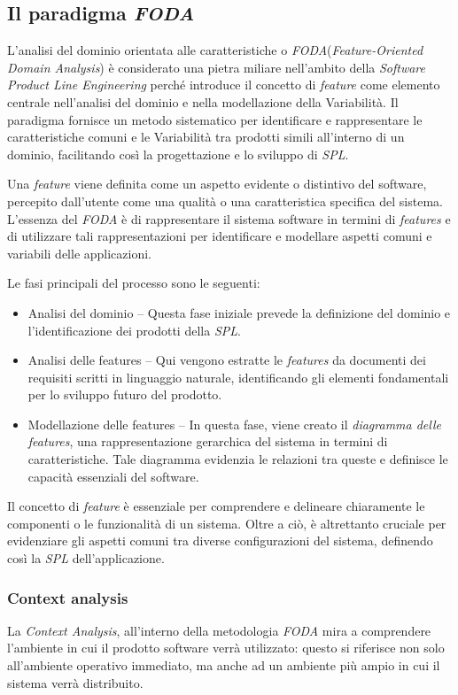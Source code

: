 \documentclass[12pt]{report}
\newcommand{\spl}{\textsl{SPL}\xspace}
\newcommand{\foda}{\textsl{FODA}\xspace}
\begin{document}
\subsection{ Il paradigma \foda}
L'analisi del dominio orientata alle caratteristiche o \foda (\textit{Feature-Oriented Domain Analysis}) \cite{kang:cohen:hess:nowak:peters}
è considerato una pietra miliare nell'ambito della \textit{Software Product Line Engineering} perché introduce il concetto di \textit{feature} come elemento centrale nell'analisi del dominio e nella modellazione della Variabilità. Il paradigma fornisce un metodo sistematico per identificare e rappresentare le caratteristiche comuni e le Variabilità tra prodotti simili all'interno di un dominio, facilitando così la progettazione e lo sviluppo di \spl.

Una \textit{feature} viene definita come un aspetto evidente o distintivo del software, percepito dall'utente come una qualità o una caratteristica specifica del sistema. L'essenza del \foda è di rappresentare il sistema software in termini di \textit{features} e di utilizzare tali rappresentazioni per identificare e modellare aspetti comuni e variabili delle applicazioni.

Le fasi principali del processo sono le seguenti:

\begin{itemize}
\item \textsf{Analisi del dominio} -- Questa fase iniziale prevede la definizione del dominio e l'identificazione dei prodotti della \spl.
\item \textsf{Analisi delle features} -- Qui vengono estratte le \textit{features} da documenti dei requisiti scritti in linguaggio naturale, identificando gli elementi fondamentali per lo sviluppo futuro del prodotto.
\item \textsf{Modellazione delle features} -- In questa fase, viene creato il \textit{diagramma delle features}, una rappresentazione gerarchica del sistema in termini di caratteristiche. Tale diagramma evidenzia le relazioni tra queste e definisce le capacità essenziali del software.
\end{itemize}

Il concetto di \textit{feature} è essenziale per comprendere e delineare chiaramente le componenti o le funzionalità di un sistema. Oltre a ciò, è altrettanto cruciale per evidenziare gli aspetti comuni tra diverse configurazioni del sistema, definendo così la \spl dell'applicazione.


\subsubsection{Context analysis}
La \textit{Context Analysis}, all'interno della metodologia \foda  mira a comprendere l'ambiente in cui il prodotto software verrà utilizzato: questo si riferisce non solo all'ambiente operativo immediato, ma anche ad un ambiente più ampio in cui il sistema verrà distribuito.
\end{document}
